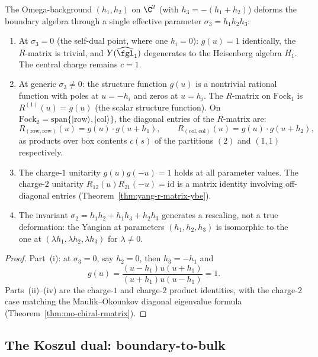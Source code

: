 \begin{proposition}
\label{prop:omega-deformation}
The Omega-background $(h_1, h_2)$ on $\C^2$ (with $h_3 = -(h_1+h_2)$) deforms the boundary algebra through a single effective parameter $\sigma_3 = h_1 h_2 h_3$:
\begin{enumerate}[label=\textup{(\roman*)}]
 \item At $\sigma_3 = 0$ (the self-dual point, where one $h_i = 0$): $g(u) = 1$ identically, the $R$-matrix is trivial, and $Y(\widehat{\fgl}_1)$ degenerates to the Heisenberg algebra $H_1$. The central charge remains $c = 1$.
 \item At generic $\sigma_3 \neq 0$: the structure function $g(u)$ is a nontrivial rational function with poles at $u = -h_i$ and zeros at $u = h_i$. The $R$-matrix on $\mathrm{Fock}_1$ is $R^{(1)}(u) = g(u)$ (the scalar structure function). On $\mathrm{Fock}_2 = \mathrm{span}\{|\mathrm{row}\rangle, |\mathrm{col}\rangle\}$, the diagonal entries of the $R$-matrix are:
 \[
 R_{(\mathrm{row},\mathrm{row})}(u) = g(u) \cdot g(u + h_1), \qquad
 R_{(\mathrm{col},\mathrm{col})}(u) = g(u) \cdot g(u + h_2),
 \]
 as products over box contents $c(s)$ of the partitions $(2)$ and $(1,1)$ respectively.
 \item The charge-$1$ unitarity $g(u) g(-u) = 1$ holds at all parameter values. The charge-$2$ unitarity $R_{12}(u) R_{21}(-u) = \mathrm{id}$ is a matrix identity involving off-diagonal entries (Theorem~\ref{thm:yang-r-matrix-ybe}).
 \item The invariant $\sigma_2 = h_1 h_2 + h_1 h_3 + h_2 h_3$ generates a rescaling, not a true deformation: the Yangian at parameters $(h_1,h_2,h_3)$ is isomorphic to the one at $(\lambda h_1, \lambda h_2, \lambda h_3)$ for $\lambda \neq 0$.
\end{enumerate}
\end{proposition}

\begin{proof}
Part~(i): at \(\sigma_3=0\), say \(h_2=0\), then \(h_3=-h_1\) and
\[
g(u)=\frac{(u-h_1)u(u+h_1)}{(u+h_1)u(u-h_1)}=1 .
\]
Parts~(ii)--(iv) are the charge-\(1\) and charge-\(2\) product
identities, with the charge-\(2\) case matching the
Maulik--Okounkov diagonal eigenvalue formula
(Theorem~\ref{thm:mo-chiral-rmatrix}).
\end{proof}

\subsection{The Koszul dual: boundary-to-bulk}
\label{subsec:5d-koszul-dual}

